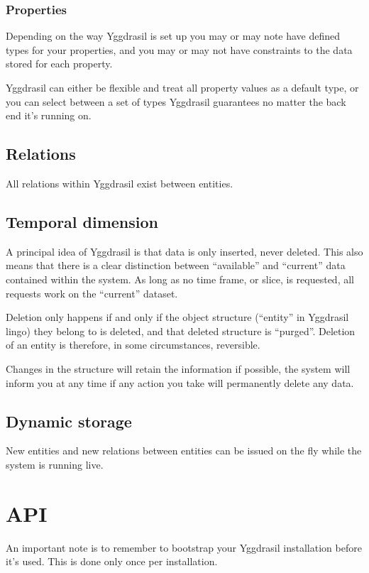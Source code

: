 \documentclass[english,a4paper]{article}
\begin{document}
\subsubsection{Properties}

Depending on the way Yggdrasil is set up you may or may note have
defined types for your properties, and you may or may not have
constraints to the data stored for each property.  

Yggdrasil can either be flexible and treat all property values as a
default type, or you can select between a set of types Yggdrasil
guarantees no matter the back end it's running on.

\subsection{Relations}

All relations within Yggdrasil exist between entities.  
 
\subsection{Temporal dimension}

A principal idea of Yggdrasil is that data is only inserted, never
deleted.  This also means that there is a clear distinction between
``available'' and ``current'' data contained within the system.
As long as no time frame, or slice, is requested, all requests work on
the ``current'' dataset. 

Deletion only happens if and only if the object structure (``entity''
in Yggdrasil lingo) they belong to is deleted, and that deleted
structure is ``purged''.  Deletion of an entity is therefore, in some
circumstances, reversible.

Changes in the structure will retain the information if possible, the
system will inform you at any time if any action you take will
permanently delete any data.

\subsection{Dynamic storage}

New entities and new relations between entities can be issued on the
fly while the system is running live.  

\section{API}

An important note is to remember to bootstrap your Yggdrasil
installation before it's used.  This is done only once per installation.
\end{document}
